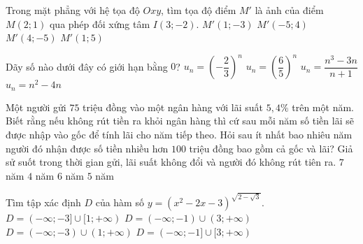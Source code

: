 \begin{ex}%
Trong mặt phẳng với hệ tọa độ $Oxy$, tìm tọa độ điểm $M'$ là ảnh của điểm $M(2;1)$ qua phép đối xứng tâm $I(3;-2)$.
\choice
{$M'(1;-3)$}
{$M'(-5;4)$}
{\True $M'(4;-5)$}
{$M'(1;5)$}
\end{ex}

\begin{ex}%
Dãy số nào dưới đây có giới hạn bằng $0$?
\choice
{\True $u_n=\left(-\dfrac{2}{3} \right)^n$}
{$u_n=\left(\dfrac{6}{5} \right)^n$}
{$u_n=\dfrac{n^3-3n}{n+1}$}
{$u_n=n^2-4n$}
\end{ex}

\begin{ex}%
Một người gửi $75$ triệu đồng vào một ngân hàng với lãi suất $5,4 \%$ trên một năm. Biết rằng nếu không rút tiền ra khỏi ngân hàng thì cứ sau mỗi năm số tiền lãi sẽ được nhập vào gốc để tính lãi cho năm tiếp theo. Hỏi sau ít nhất bao nhiêu năm người đó nhận được số tiền nhiều hơn $100$ triệu đồng bao gồm cả gốc và lãi? Giả sử suốt trong thời gian gửi, lãi suất không đổi và người đó không rút tiên ra.
\choice
{$7$ năm}
{$4$ năm}
{\True $6$ năm}
{$5$ năm}
\end{ex}

\begin{ex}%
Tìm tập xác định $D$ của hàm số $y=\left(x^2-2x-3 \right)^{\sqrt{2-\sqrt{3}}}$.
\choice
{$D=(-\infty ; -3]\cup [1; +\infty)$}
{\True $D=(-\infty ; -1)\cup (3; +\infty)$}
{$D=(-\infty ; -3)\cup (1; +\infty)$}
{$D=(-\infty ; -1]\cup [3; +\infty)$}
\end{ex}

